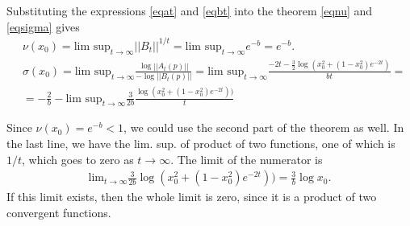 \begin{solution}[9.4]
Substituting the expressions \eqref{eqat} and \eqref{eqbt} into the theorem \eqref{eqnu} and \eqref{eqsigma} gives
\begin{align}
    &\nu(x_0) = \text{lim sup}_{t\to \infty} ||B_t||^{1/t} = \text{lim sup}_{t\to \infty} e^{-b} = e^{-b}. \\
    &\sigma(x_0) = \text{lim sup}_{t\to \infty} \frac{\log ||A_t(p)||}{-\log ||B_t(p)||} =\text{lim sup}_{t\to \infty}  \frac{-2t -\frac{3}{2}\log (x_0^2 + (1-x_0^2)e^{-2t})}{bt} = \\
    & = -\frac{2}{b} - \text{lim sup}_{t\to \infty} \frac{3}{2b}\frac{\log(x_0^2 + (1-x_0^2)e^{-2t}))}{t}
\end{align}

Since $\nu(x_0) = e^{-b} <1 $, we could use the second part of the theorem as well. In the last line, we have the lim. sup. of product of two functions, one of which is $1/t$, which goes to zero as $t\to \infty$. 
The limit of the numerator is
\begin{align}
\text{lim}_{t\to \infty} \frac{3}{2b}\log(x_0^2 + (1-x_0^2)e^{-2t})) = \frac{3}{b}\log x_0.
\end{align}
If this limit exists, then the whole limit is zero, since it is a product of two convergent functions. 


\end{solution}
